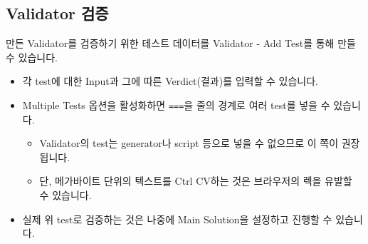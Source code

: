 \documentclass{article}
\begin{document}
    \subsection{Validator 검증}
    만든 Validator를 검증하기 위한 테스트 데이터를 Validator - Add Test를 통해 만들 수 있습니다.
    \begin{itemize}
        \item 각 test에 대한 Input과 그에 따른 Verdict(결과)를 입력할 수 있습니다.
        \item Multiple Tests 옵션을 활성화하면 \verb|===|을 줄의 경계로 여러 test를 넣을 수 있습니다.
        \begin{itemize}
            \item Validator의 test는 generator나 script 등으로 넣을 수 없으므로 이 쪽이 권장됩니다.
            \item 단, 메가바이트 단위의 텍스트를 Ctrl CV하는 것은 브라우저의 렉을 유발할 수 있습니다.
        \end{itemize}
        \item 실제 위 test로 검증하는 것은 나중에 Main Solution을 설정하고 진행할 수 있습니다.
    \end{itemize}
\end{document}
